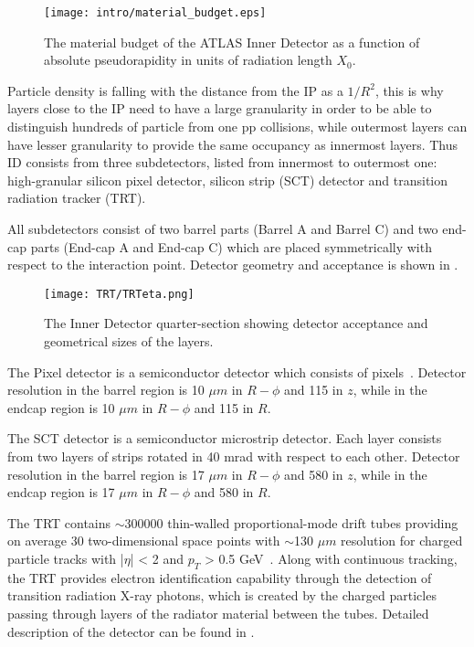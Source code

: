 \begin{figure}
\centering
\texttt{[image: intro/material\_budget.eps]}
\caption{ 
The material budget of the ATLAS Inner Detector as a function of absolute pseudorapidity in units of radiation length $X_0$.
}
\label{fig:material_budget}
\end{figure}


Particle density is falling with the distance from the IP as a $1/R^2$, this is why layers close to the IP need to have a large granularity in order to be able to distinguish 
hundreds of particle from one pp collisions, while outermost layers can have lesser granularity to provide the same occupancy as innermost layers.
Thus ID consists from three subdetectors, listed from innermost to outermost one: high-granular silicon pixel detector, silicon strip (SCT) detector and transition radiation tracker (TRT).

All subdetectors consist of two barrel parts (Barrel A and Barrel C) and two end-cap parts (End-cap A and End-cap C) 
which are placed symmetrically with respect to the interaction point.
Detector geometry and acceptance is shown in .

\begin{figure}
\centering
\texttt{[image: TRT/TRTeta.png]}
\caption{ 
The Inner Detector quarter-section showing detector acceptance and geometrical sizes of the layers.
}
\label{fig:ID_eta}
\end{figure}


The Pixel detector is a semiconductor detector which consists of pixels~\cite{Wermes:381263}.
Detector resolution in the barrel region is 10 $\mu m$ in $R-\phi$ and 115 in $z$,
while in the endcap region is 10 $\mu m$ in $R-\phi$ and 115 in $R$.

The SCT detector is a semiconductor microstrip detector. Each layer consists from
two layers of strips rotated in 40 mrad with respect to each other.
Detector resolution in the barrel region is 17 $\mu m$ in $R-\phi$ and 580 in $z$,
while in the endcap region is 17 $\mu m$ in $R-\phi$ and 580 in $R$.

The TRT contains $\sim$300000 thin-walled proportional-mode drift tubes providing on average 30 two-dimensional 
space points with $\sim$130 $\mu m$ resolution for charged particle tracks with |$\eta$| < 2 and $p_T$ > 0.5 GeV~\cite{Abat:2008zza,Abat:2008zzb,Abat:2008zz}.
Along with continuous tracking, the TRT provides electron identification capability through the detection of transition radiation X-ray photons, which is created by the charged particles passing through layers of the radiator material between the tubes.
Detailed description of the detector can be found in .




